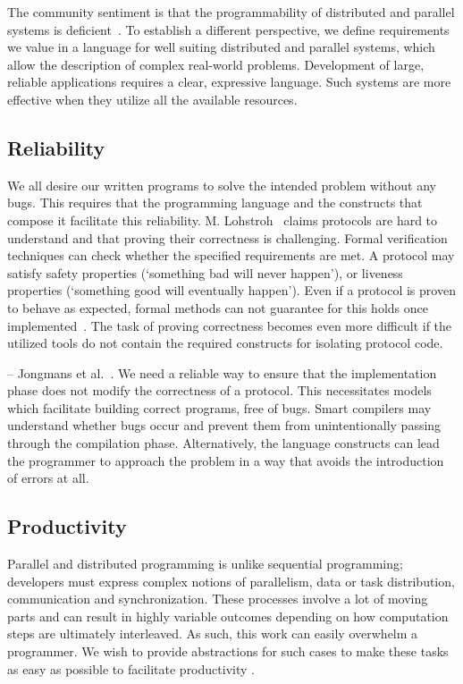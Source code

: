 
The community sentiment is that the programmability of distributed and parallel systems is deficient~\cite{coordination,proper,chapel,langNec}. To establish a different perspective, we define requirements we value in a language for well suiting distributed and parallel systems, which allow the description of complex real-world problems. Development of large, reliable applications requires a clear, expressive language. Such systems are more effective when they utilize all the available resources.

\subsection{Reliability}
\label{sec:feature:reliability}
We all desire our written programs to solve the intended problem without any bugs.
This requires that the programming language and the constructs that compose it facilitate this reliability.
M. Lohstroh~\cite{criticalPathReo} claims protocols are hard to understand and that proving their correctness is challenging. Formal verification techniques can check whether the specified requirements are met. A protocol may satisfy safety properties (`something bad will never happen'), or liveness properties (`something good will eventually happen'). 
Even if a protocol is proven to behave as expected, formal methods can not guarantee for this holds once implemented~\cite{criticalPathReo}. The task of proving correctness becomes even more difficult if the utilized tools do not contain the required constructs for isolating protocol code. 

 -- Jongmans et al.~\cite{modularizationReo}.
We need a reliable way to ensure that the implementation phase does not modify the correctness of a protocol. 
This necessitates models which facilitate building correct programs, free of bugs. Smart compilers may understand whether bugs occur and prevent them from unintentionally passing through the compilation phase. Alternatively, the language constructs can lead the programmer to approach the problem in a way that avoids the introduction of errors at all.

\subsection{Productivity}
\label{sec:feature:clarity}
Parallel and distributed programming is unlike sequential programming; developers must express complex notions of parallelism, data or task distribution, communication and synchronization. These processes involve a lot of moving parts and can result in highly variable outcomes depending on how computation steps are ultimately interleaved. As such, this work can easily overwhelm a programmer. We wish to provide abstractions for such cases to make these tasks as easy as possible to facilitate productivity \cite{chapel}.

